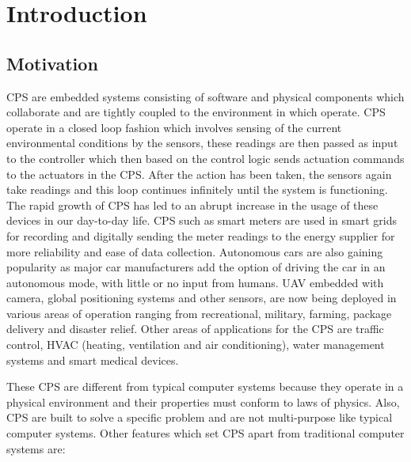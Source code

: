 
\chapter{Introduction}
\label{ch:Introduction}

\section{Motivation}
\label{sec:Motivation}

\ac{CPS} are embedded systems consisting of software and physical components which collaborate and are tightly coupled to the environment in which operate. \ac{CPS} operate in a closed loop fashion which involves sensing of the current environmental conditions by the sensors, these readings are then passed as input to the controller which then based on the control logic sends actuation commands to the actuators in the \ac{CPS}. After the action has been taken, the sensors again take readings and this loop continues infinitely until the system is functioning. The rapid growth of \ac{CPS} has led to an abrupt increase in the usage of these devices in our day-to-day life. \ac{CPS} such as smart meters are used in smart grids\cite{karnouskos2011cyber, ericsson2010cyber} for recording and digitally sending the meter readings to the energy supplier for more reliability and ease of data collection. Autonomous cars\cite{checkoway2011comprehensive, yang2014vehicle} are also gaining popularity as major car manufacturers add the option of driving the car in an autonomous mode, with little or no input from humans. \ac{UAV}\cite{javaid2012cyber, mohammed2014uavs} embedded with camera, global positioning systems and other sensors, are now being deployed in various areas of operation ranging from recreational, military, farming, package delivery and disaster relief. Other areas of applications for the \ac{CPS} are traffic control, HVAC (heating, ventilation and air conditioning), water management systems and smart medical devices.

These \ac{CPS} are different from typical computer systems because they operate in a physical environment and their properties must conform to laws of physics. Also, \ac{CPS} are built to solve a specific problem and are not multi-purpose like typical computer systems. Other features which set \ac{CPS} apart from traditional computer systems are:

